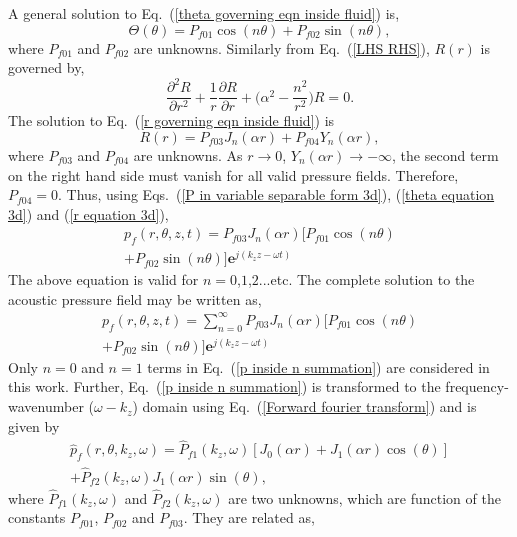 \documentclass[twocolumn,10pt]{asme2ej}
\begin{document}
A general solution to Eq.~(\ref{theta governing eqn inside fluid}) is,
\begin{equation}\label{theta equation 3d}
    \Theta(\theta) = P_{f01} \cos(n \theta) + P_{f02} \sin(n \theta),
\end{equation}
where $P_{f01}$ and $P_{f02}$ are unknowns. Similarly from Eq.~(\ref{LHS RHS}), $R(r)$ is governed by,
\begin{equation}\label{r governing eqn inside fluid}
    \frac{\partial^{2}R}{\partial r^{2}} + \frac{1}{r}\frac{\partial R}{\partial r} + \bigg(\alpha^2 - \frac{n^2}{r^2}\bigg)R = 0.
\end{equation}
The solution to Eq.~(\ref{r governing eqn inside fluid}) is
\begin{equation}\label{r equation 3d}
    R(r) = P_{f03} J_n(\alpha r) + P_{f04} Y_n(\alpha r),
\end{equation}
where $P_{f03}$ and $P_{f04}$ are unknowns. As $r \rightarrow 0$, $Y_n(\alpha r) \rightarrow -\infty$, the second term on the right hand side must vanish for all valid pressure fields. Therefore, $P_{f04} = 0$. Thus, using Eqs.~(\ref{P in variable separable form 3d}), (\ref{theta equation 3d}) and (\ref{r equation 3d}),
\begin{multline}\label{P inside 3d untransformed in z,t}
    p_f(r,\theta,z,t) =  P_{f03} J_n(\alpha r)[P_{f01} \cos(n \theta)\\ + P_{f02} \sin(n \theta)]\mathbf{e}^{j(k_{z}z-\omega t)}
\end{multline}
The above equation is valid for $n=0$,$1$,$2$...etc. The complete solution to the acoustic pressure field may be written as,
\begin{multline}\label{p inside n summation}
    p_f(r,\theta,z,t) =  \sum_{n=0}^{\infty}P_{f03} J_n(\alpha r)[P_{f01} \cos(n \theta)\\ + P_{f02} \sin(n \theta)]\mathbf{e}^{j(k_{z}z-\omega t)}
\end{multline}
Only $n=0$ and $n=1$ terms in Eq.~(\ref{p inside n summation}) are considered in this work. Further, Eq.~(\ref{p inside n summation}) is transformed to the frequency-wavenumber ($\omega-k_z$) domain using Eq.~(\ref{Forward fourier transform}) and is given by
\begin{multline}\label{P inside 3d}
    \hat{p}_f(r,\theta,k_z,\omega) = \hat{P}_{f1}(k_z,\omega)[J_0(\alpha r) + J_1(\alpha r)\cos(\theta)]\\ + \hat{P}_{f2}(k_z,\omega)J_1(\alpha r)\sin(\theta),
\end{multline}
where $\hat{P}_{f1}(k_z,\omega)$ and $\hat{P}_{f2}(k_z,\omega)$ are two unknowns, which are function of the constants $P_{f01}$, $P_{f02}$ and $P_{f03}$. They are related as,
\end{document}
